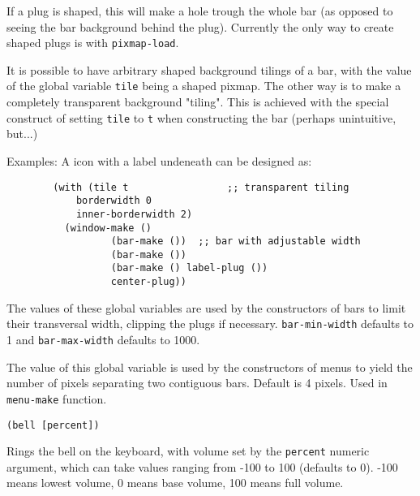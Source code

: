 If a plug is shaped, this will make a hole trough the whole bar (as
   opposed to seeing the bar background behind the plug). Currently the
   only way to create shaped plugs is with \verb|pixmap-load|.

It is possible to have arbitrary shaped background tilings of a bar, with the
   value of the global variable \verb|tile| being a shaped pixmap. The other
   way is to make a completely transparent background "tiling". This is
   achieved with the special construct of setting \verb|tile| to \verb|t| when
   constructing the bar (perhaps unintuitive, but...)

{Examples: A icon with a label undeneath can be designed as:
\exemplefont\upspace\begin{verbatim}
        (with (tile t                 ;; transparent tiling
            borderwidth 0
            inner-borderwidth 2)
          (window-make ()
                  (bar-make ())  ;; bar with adjustable width
                  (bar-make ())
                  (bar-make () label-plug ())
                  center-plug))
\end{verbatim}}



The values of these global variables are used by the constructors of bars to
limit their transversal width, clipping the plugs if necessary.
\verb"bar-min-width" defaults to 1 and \verb"bar-max-width" defaults to 1000.

        

The value of this global variable is used by the constructors of menus to
yield the number of pixels separating two contiguous bars.  Default is 4
pixels. Used in  \verb"menu-make" function.


{\usagefont\begin{verbatim}
(bell [percent])
\end{verbatim}}\usageupspace

Rings the bell on the keyboard, with volume set by the \verb"percent"
numeric argument, which can take values ranging from -100 to 100 (defaults
to 0). -100 means lowest volume, 0 means base volume, 100 means full volume.

